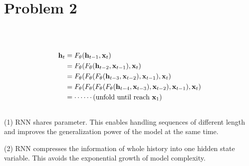 \section{Problem 2}~\label{sec:prob2}

\subsection{} %

\begin{equation}
\begin{split}
    {\mathbf{h}}_t
        &= F_\theta({\mathbf{h}}_{t-1},{\mathbf{x}}_t) \\
        &= F_\theta(F_\theta({\mathbf{h}}_{t-2},{\mathbf{x}}_{t-1}),{\mathbf{x}}_t) \\
        &= F_\theta(F_\theta(F_\theta({\mathbf{h}}_{t-3},{\mathbf{x}}_{t-2}),{\mathbf{x}}_{t-1}),{\mathbf{x}}_t) \\
        &= F_\theta(F_\theta(F_\theta(F_\theta({\mathbf{h}}_{t-4},{\mathbf{x}}_{t-3}),{\mathbf{x}}_{t-2}),{\mathbf{x}}_{t-1}),{\mathbf{x}}_t) \\
        &= \cdots\cdots (\text{unfold until reach } {\mathbf{x}}_1)\\
\end{split}
\end{equation}

\subsection{} %

(1) RNN shares parameter.
This enables handling sequences of different length
and improves the generalization power of the model at the same time.

(2) RNN compresses the information of whole history into one hidden state variable.
This avoids the exponential growth of model complexity.
